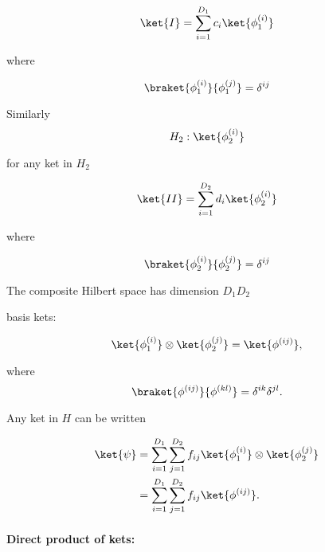 \begin{equation}\label{eqn:qmTwoL1:90}
\ket{I} = \sum_{i=1}^{D_1} c_i \ket{\phi_1^{(i)}} 
\end{equation}

where

\begin{equation}\label{eqn:qmTwoL1:110}
\braket{ \phi_1^{(i)}}{ \phi_1^{(j)}} = \delta^{i j}
\end{equation}

Similarly
\begin{equation}\label{eqn:qmTwoL1:130}
H_2 : { \ket{\phi_2^{(i)}} }
\end{equation}

for any ket in $H_2$

\begin{equation}\label{eqn:qmTwoL1:150}
\ket{II} = \sum_{i=1}^{D_2} d_i \ket{\phi_2^{(i)}} 
\end{equation}

where

\begin{equation}\label{eqn:qmTwoL1:170}
\braket{ \phi_2^{(i)}}{ \phi_2^{(j)}} = \delta^{i j}
\end{equation}

The composite Hilbert space has dimension $D_1 D_2$

basis kets:

\begin{equation}\label{eqn:qmTwoL1:190}
\ket{ \phi_1^{(i)}} \otimes \ket{ \phi_2^{(j)}}  = \ket{ \phi^{(ij)}},
\end{equation}

where
\begin{equation}\label{eqn:qmTwoL1:210}
\braket{ \phi^{(ij)}}{ \phi^{(kl)}} = \delta^{ik} \delta^{jl}.
\end{equation}

Any ket in $H$ can be written

\begin{align*}
\ket{\psi} 
&= 
\sum_{i = 1}^{D_1}
\sum_{j = 1}^{D_2}
f_{ij}
\ket{ \phi_1^{(i)}} \otimes \ket{ \phi_2^{(j)}}  \\
&= 
\sum_{i = 1}^{D_1}
\sum_{j = 1}^{D_2}
f_{ij}
\ket{ \phi^{(ij)}}.
\end{align*}

\paragraph{Direct product of kets:}

